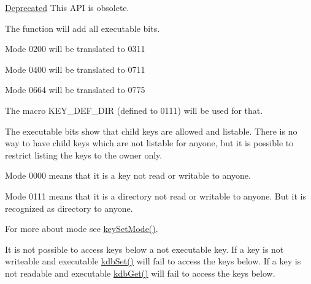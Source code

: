 \begin{Desc}
\item[\hyperlink{deprecated__deprecated000006}{Deprecated}]This API is obsolete.\end{Desc}


The function will add all executable bits.


\begin{DoxyItemize}
\item Mode 0200 will be translated to 0311
\item Mode 0400 will be translated to 0711
\item Mode 0664 will be translated to 0775
\end{DoxyItemize}

The macro KEY\_\-DEF\_\-DIR (defined to 0111) will be used for that.

The executable bits show that child keys are allowed and listable. There is no way to have child keys which are not listable for anyone, but it is possible to restrict listing the keys to the owner only.


\begin{DoxyItemize}
\item Mode 0000 means that it is a key not read or writable to anyone.
\item Mode 0111 means that it is a directory not read or writable to anyone. But it is recognized as directory to anyone.
\end{DoxyItemize}

For more about mode see \hyperlink{group__keymeta_ga8803037e35b9da1ce492323a88ff6bc3}{keySetMode()}.

It is not possible to access keys below a not executable key. If a key is not writeable and executable \hyperlink{group__kdb_ga11436b058408f83d303ca5e996832bcf}{kdbSet()} will fail to access the keys below. If a key is not readable and executable \hyperlink{group__kdb_ga28e385fd9cb7ccfe0b2f1ed2f62453a1}{kdbGet()} will fail to access the keys below.


